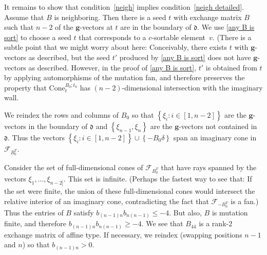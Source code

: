 \documentclass{amsart}
\theoremstyle{definition}
\theoremstyle{remark}
\numberwithin{equation}{section}
\newcommand{\set}[1]{{\left\lbrace #1 \right\rbrace}}
\newcommand{\F}{{\mathcal F}}
\newcommand{\0}{{\mathbf{0}}}
\newcommand{\Cone}{\mathrm{Cone}}
\newcommand{\g}{\mathbf{g}}
\renewcommand{\d}{{\mathfrak d}}
\begin{document}
It remains to show that condition~\eqref{neigh} implies condition~\eqref{neigh detailed}.
Assume that $B$ is neighboring.
Then there is a seed $t$ with exchange matrix $B$ such that $n-2$ of the $\g$-vectors at $t$ are in the boundary of $\d$.
We use \cref{any B is sort} to choose a seed $t$ that corresponds to a $c$-sortable element~$v$.
(There is a subtle point that we might worry about here:
Conceivably, there exists $t$ with $\g$-vectors as described, but the seed $t'$ produced by \cref{any B is sort} does not have $\g$-vectors as described.
However, in the proof of  \cref{any B is sort}, $t'$ is obtained from $t$ by applying automorphisms of the mutation fan, and therefore preserves the property that $\Cone_t^{B_0;t_0}$ has $(n-2)$-dimensional intersection with the imaginary wall.

We reindex the rows and columns of $B_0$ so that $\set{\xi_i:i\in[1,n-2]}$ are the $\g$-vectors in the boundary of $\d$ and $\set{\xi_{n-1},\xi_n}$ are the $\g$-vectors not contained in~$\d$.
Thus the vectors $\set{\xi_i:i\in[1,n-2]}\cup\set{-B_0\delta}$ span an imaginary cone in $\F_{B_0^T}$.

Consider the set of full-dimensional cones of $\F_{B_0^T}$ that have rays spanned by the vectors $\xi_1,\ldots,\xi_{n-2]}$. 
This set is infinite.
(Perhaps the fastest way to see that:  If the set were finite, the union of these full-dimensional cones would intersect the relative interior of an imaginary cone, contradicting the fact that $\F_{-B_0^T}$ is a fan.)
Thus the entries of $B$ satisfy $b_{(n-1)n}b_{n(n-1)}\le-4$.
But also, $B$ is mutation finite, and therefore $b_{(n-1)n}b_{n(n-1)}\ge-4$.
We see that $B_44$ is a rank-$2$ exchange matrix of affine type.
If necessary, we reindex (swapping positions $n-1$ and $n$) so that $b_{(n-1)n}>0$.
\end{document}
